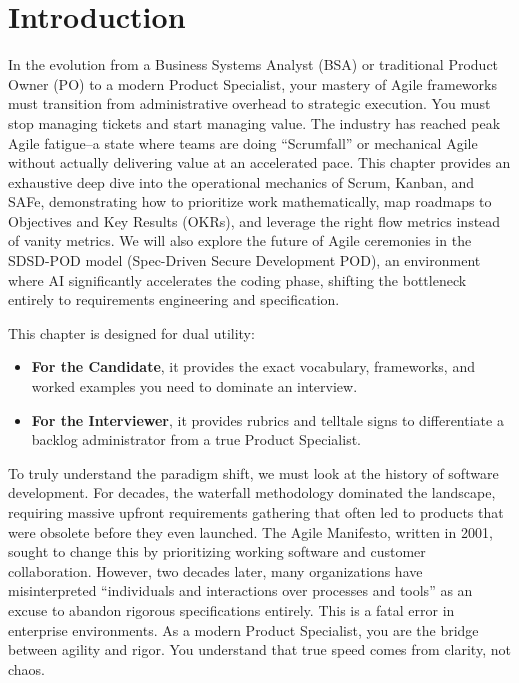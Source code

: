 \documentclass[
  11pt,
  openany,
  oneside]{book}
\providecommand{\tightlist}{%
  \setlength{\itemsep}{0pt}\setlength{\parskip}{0pt}}
\begin{document}
\section{Introduction}\label{introduction}

In the evolution from a Business Systems Analyst (BSA) or traditional
Product Owner (PO) to a modern Product Specialist, your mastery of Agile
frameworks must transition from administrative overhead to strategic
execution. You must stop managing tickets and start managing value. The
industry has reached peak Agile fatigue--a state where teams are doing
``Scrumfall'' or mechanical Agile without actually delivering value at
an accelerated pace. This chapter provides an exhaustive deep dive into
the operational mechanics of Scrum, Kanban, and SAFe, demonstrating how
to prioritize work mathematically, map roadmaps to Objectives and Key
Results (OKRs), and leverage the right flow metrics instead of vanity
metrics. We will also explore the future of Agile ceremonies in the
SDSD-POD model (Spec-Driven Secure Development POD), an environment
where AI significantly accelerates the coding phase, shifting the
bottleneck entirely to requirements engineering and specification.

This chapter is designed for dual utility:

\begin{itemize}
\tightlist
\item
  \textbf{For the Candidate}, it provides the exact vocabulary,
  frameworks, and worked examples you need to dominate an interview.
\item
  \textbf{For the Interviewer}, it provides rubrics and telltale signs
  to differentiate a backlog administrator from a true Product
  Specialist.
\end{itemize}

To truly understand the paradigm shift, we must look at the history of
software development. For decades, the waterfall methodology dominated
the landscape, requiring massive upfront requirements gathering that
often led to products that were obsolete before they even launched. The
Agile Manifesto, written in 2001, sought to change this by prioritizing
working software and customer collaboration. However, two decades later,
many organizations have misinterpreted ``individuals and interactions
over processes and tools'' as an excuse to abandon rigorous
specifications entirely. This is a fatal error in enterprise
environments. As a modern Product Specialist, you are the bridge between
agility and rigor. You understand that true speed comes from clarity,
not chaos.
\end{document}
